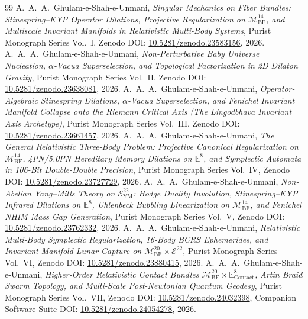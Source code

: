 \documentclass[11pt,a4paper,reqno]{article}
\theoremstyle{plain}
\theoremstyle{definition}
\theoremstyle{remark}
\numberwithin{equation}{section}
\numberwithin{table}{section}
\begin{document}
\begin{thebibliography}{99}
 A.~A.~A.~Ghulam-e-Shah-e-Unmani, \emph{Singular Mechanics on Fiber Bundles: Stinespring--KYP Operator Dilations, Projective Regularization on $\mathcal{M}_{\mathrm{BF}}^{14}$, and Multiscale Invariant Manifolds in Relativistic Multi-Body Systems}, Purist Monograph Series Vol.~I, Zenodo DOI: \href{https://doi.org/10.5281/zenodo.23583156}{10.5281/zenodo.23583156}, 2026.
 A.~A.~A.~Ghulam-e-Shah-e-Unmani, \emph{Non-Perturbative Baby Universe Nucleation, $\alpha$-Vacua Superselection, and Topological Factorization in 2D Dilaton Gravity}, Purist Monograph Series Vol.~II, Zenodo DOI: \href{https://doi.org/10.5281/zenodo.23638081}{10.5281/zenodo.23638081}, 2026.
 A.~A.~A.~Ghulam-e-Shah-e-Unmani, \emph{Operator-Algebraic Stinespring Dilations, $\alpha$-Vacua Superselection, and Fenichel Invariant Manifold Collapse onto the Riemann Critical Axis (The Lingodbhava Invariant Axis Archetype)}, Purist Monograph Series Vol.~III, Zenodo DOI: \href{https://doi.org/10.5281/zenodo.23661457}{10.5281/zenodo.23661457}, 2026.
 A.~A.~A.~Ghulam-e-Shah-e-Unmani, \emph{The General Relativistic Three-Body Problem: Projective Canonical Regularization on $\mathcal{M}_{\mathrm{BF}}^{14}$, 4PN/5.0PN Hereditary Memory Dilations on $\mathbb{E}^8$, and Symplectic Automata in 106-Bit Double-Double Precision}, Purist Monograph Series Vol.~IV, Zenodo DOI: \href{https://doi.org/10.5281/zenodo.23727729}{10.5281/zenodo.23727729}, 2026.
 A.~A.~A.~Ghulam-e-Shah-e-Unmani, \emph{Non-Abelian Yang--Mills Theory on $\mathcal{E}_{\mathrm{YM}}^{22}$: Hodge Duality Involution, Stinespring--KYP Infrared Dilations on $\mathbb{E}^8$, Uhlenbeck Bubbling Linearization on $\mathcal{M}_{\mathrm{BF}}^{14}$, and Fenichel NHIM Mass Gap Generation}, Purist Monograph Series Vol.~V, Zenodo DOI: \href{https://doi.org/10.5281/zenodo.23762332}{10.5281/zenodo.23762332}, 2026.
 A.~A.~A.~Ghulam-e-Shah-e-Unmani, \emph{Relativistic Multi-Body Symplectic Regularization, 16-Body BCRS Ephemerides, and Invariant Manifold Lunar Capture on $\mathcal{M}_{\mathrm{BF}}^{20} \times \mathcal{E}^{22}$}, Purist Monograph Series Vol.~VI, Zenodo DOI: \href{https://doi.org/10.5281/zenodo.23880415}{10.5281/zenodo.23880415}, 2026.
 A.~A.~A.~Ghulam-e-Shah-e-Unmani, \emph{Higher-Order Relativistic Contact Bundles $\mathcal{M}_{\mathrm{BF}}^{20} \times \mathbb{E}_{\mathrm{Contact}}^8$, Artin Braid Swarm Topology, and Multi-Scale Post-Newtonian Quantum Geodesy}, Purist Monograph Series Vol.~VII, Zenodo DOI: \href{https://doi.org/10.5281/zenodo.24032398}{10.5281/zenodo.24032398}, Companion Software Suite DOI: \href{https://doi.org/10.5281/zenodo.24054278}{10.5281/zenodo.24054278}, 2026.

\end{thebibliography}
\end{document}
